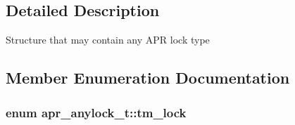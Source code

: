 \subsection{Detailed Description}
Structure that may contain any A\-P\-R lock type 

\subsection{Member Enumeration Documentation}
\hypertarget{structapr__anylock__t_a047e5c4d930f359618a96fd5e857f851}{
\subsubsection[{tm\-\_\-lock}]{\setlength{\rightskip}{0pt plus 5cm}enum {\bf apr\-\_\-anylock\-\_\-t\-::tm\-\_\-lock}}}\label{structapr__anylock__t_a047e5c4d930f359618a96fd5e857f851}
